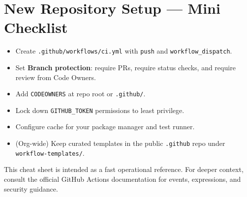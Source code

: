 \documentclass[11pt]{article}
\begin{document}
\section{New Repository Setup — Mini Checklist}
\begin{tcolorbox}
\begin{itemize}
  \item Create \texttt{.github/workflows/ci.yml} with \texttt{push} and \texttt{workflow\_dispatch}.
  \item Set \textbf{Branch protection}: require PRs, require status checks, and require review from Code Owners.
  \item Add \texttt{CODEOWNERS} at repo root or \texttt{.github/}.
  \item Lock down \texttt{GITHUB\_TOKEN} permissions to least privilege.
  \item Configure cache for your package manager and test runner.
  \item (Org-wide) Keep curated templates in the public \texttt{.github} repo under \texttt{workflow-templates/}.
\end{itemize}
\end{tcolorbox}

\vfill
\begin{center}
\footnotesize This cheat sheet is intended as a fast operational reference. For deeper context, consult the official GitHub Actions documentation for events, expressions, and security guidance.
\end{center}
\end{document}
